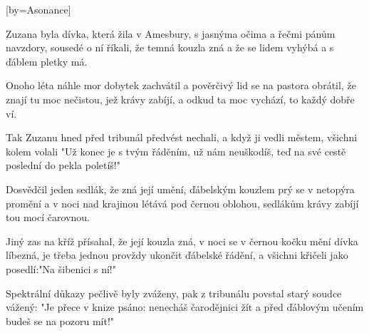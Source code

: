 [by={Asonance}]

\beginverse{}
Zuzana byla dívka, která žila v Amesbury,
s jasnýma očima a řečmi pánům navzdory,
sousedé o ní říkali, že temná kouzla zná
a že se lidem vyhýbá a s ďáblem pletky má.
\endverse{}

\beginverse{}
Onoho léta náhle mor dobytek zachvátil
a pověrčivý lid se na pastora obrátil,
že znají tu moc nečistou, jež krávy zabíjí,
a odkud ta moc vychází, to každý dobře ví.
\endverse{}

\beginverse{}
Tak Zuzanu hned před tribunál předvést nechali,
a když ji vedli městem, všichni kolem volali
"Už konec je s tvým řáděním, už nám neuškodíš,
teď na své cestě poslední do pekla poletíš!"
\endverse{}

\beginverse{}
Dosvědčil jeden sedlák, že zná její umění,
ďábelským kouzlem prý se v netopýra promění
a v noci nad krajinou létává pod černou oblohou,
sedlákům krávy zabíjí tou mocí čarovnou.
\endverse{}

\beginverse{}
Jiný zas na kříž přísahal, že její kouzla zná,
v noci se v černou kočku mění dívka líbezná,
je třeba jednou provždy ukončit ďábelské řádění,
a všichni křičeli jako posedlí:"Na šibenici s ní!"
\endverse{}

\beginverse{}
Spektrální důkazy pečlivě byly zváženy,
pak z tribunálu povstal starý soudce vážený:
"Je přece v knize psáno: nenecháš čarodějnici žít
a před ďáblovým učením budeš se na pozoru mít!"
\endverse{}

